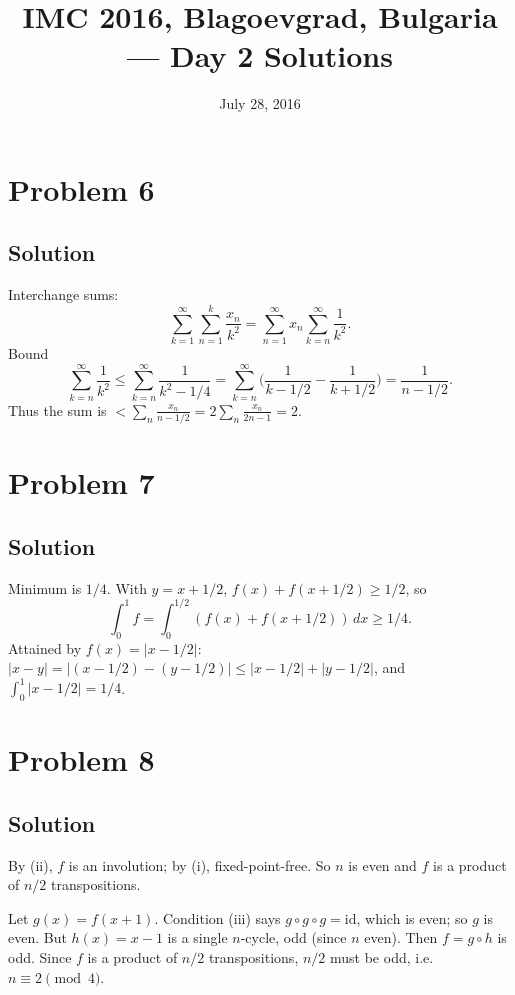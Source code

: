 \documentclass{article}
\title{IMC 2016, Blagoevgrad, Bulgaria --- Day 2 Solutions}
\date{July 28, 2016}
\begin{document}
\maketitle

\section*{Problem 6}
\subsection*{Solution}
Interchange sums:
\[ \sum_{k=1}^\infty \sum_{n=1}^k \frac{x_n}{k^2} = \sum_{n=1}^\infty x_n \sum_{k=n}^\infty \frac{1}{k^2}. \]
Bound
\[ \sum_{k=n}^\infty \frac{1}{k^2} \le \sum_{k=n}^\infty \frac{1}{k^2 - 1/4} = \sum_{k=n}^\infty\Big(\frac{1}{k-1/2} - \frac{1}{k+1/2}\Big) = \frac{1}{n - 1/2}. \]
Thus the sum is $< \sum_n \frac{x_n}{n - 1/2} = 2\sum_n \frac{x_n}{2n-1} = 2$.

\section*{Problem 7}
\subsection*{Solution}
Minimum is $1/4$. With $y = x + 1/2$, $f(x) + f(x + 1/2) \ge 1/2$, so
\[ \int_0^1 f = \int_0^{1/2} (f(x) + f(x+1/2))\,dx \ge 1/4. \]
Attained by $f(x) = |x - 1/2|$: $|x - y| = |(x - 1/2) - (y - 1/2)| \le |x-1/2| + |y-1/2|$, and $\int_0^1 |x-1/2| = 1/4$.

\section*{Problem 8}
\subsection*{Solution}
By (ii), $f$ is an involution; by (i), fixed-point-free. So $n$ is even and $f$ is a product of $n/2$ transpositions.

Let $g(x) = f(x+1)$. Condition (iii) says $g \circ g \circ g = \mathrm{id}$, which is even; so $g$ is even. But $h(x) = x - 1$ is a single $n$-cycle, odd (since $n$ even). Then $f = g \circ h$ is odd. Since $f$ is a product of $n/2$ transpositions, $n/2$ must be odd, i.e.\ $n \equiv 2 \pmod 4$.

\end{document}
